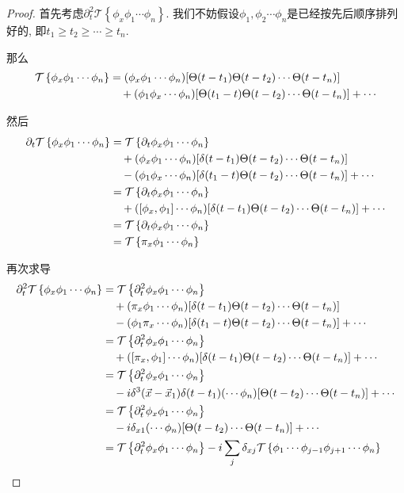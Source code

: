 \begin{proof}
    首先考虑$\partial_t^2\mathcal T\left\{\phi_x\phi_1\cdots\phi_n\right\}$. 我们不妨假设$\phi_1, \phi_2\cdots\phi_n$是已经按先后顺序排列好的, 即$t_1\geq t_2\geq\cdots\geq t_n$.
    
    那么
    \begin{align}
        \mathcal T\left\{\phi_x\phi_1\cdots\phi_n\right\}&=(\phi_x\phi_1\cdots\phi_n)[\Theta(t-t_1)\Theta(t-t_2)\cdots\Theta(t-t_n)]\notag\\
        &\quad+(\phi_1\phi_x\cdots\phi_n)[\Theta(t_1-t)\Theta(t-t_2)\cdots\Theta(t-t_n)]+\cdots
    \end{align}

    然后
    \begin{align}
        \partial_t\mathcal T\left\{\phi_x\phi_1\cdots\phi_n\right\}&=\mathcal T\left\{\partial_t\phi_x\phi_1\cdots\phi_n\right\}\notag\\
        &\quad+(\phi_x\phi_1\cdots\phi_n)[\delta(t-t_1)\Theta(t-t_2)\cdots\Theta(t-t_n)]\notag\\
        &\quad-(\phi_1\phi_x\cdots\phi_n)[\delta(t_1-t)\Theta(t-t_2)\cdots\Theta(t-t_n)]+\cdots\\
        &=\mathcal T\left\{\partial_t\phi_x\phi_1\cdots\phi_n\right\}\notag\\
        &\quad+([\phi_x, \phi_1]\cdots\phi_n)[\delta(t-t_1)\Theta(t-t_2)\cdots\Theta(t-t_n)]+\cdots\\
        &=\mathcal T\left\{\partial_t\phi_x\phi_1\cdots\phi_n\right\}\\
        &=\mathcal T\left\{\pi_x\phi_1\cdots\phi_n\right\}
    \end{align}

    再次求导
    \begin{align}
        \partial_t^2\mathcal T\left\{\phi_x\phi_1\cdots\phi_n\right\}&=\mathcal T\left\{\partial_t^2\phi_x\phi_1\cdots\phi_n\right\}\notag\\
        &\quad+(\pi_x\phi_1\cdots\phi_n)[\delta(t-t_1)\Theta(t-t_2)\cdots\Theta(t-t_n)]\notag\\
        &\quad-(\phi_1\pi_x\cdots\phi_n)[\delta(t_1-t)\Theta(t-t_2)\cdots\Theta(t-t_n)]+\cdots\\
        &=\mathcal T\left\{\partial_t^2\phi_x\phi_1\cdots\phi_n\right\}\notag\\
        &\quad+([\pi_x, \phi_1]\cdots\phi_n)[\delta(t-t_1)\Theta(t-t_2)\cdots\Theta(t-t_n)]+\cdots\\
        &=\mathcal T\left\{\partial_t^2\phi_x\phi_1\cdots\phi_n\right\}\notag\\
        &\quad-i\delta^3(\vec x-\vec x_1)\delta(t-t_1)(\cdots\phi_n)[\Theta(t-t_2)\cdots\Theta(t-t_n)]+\cdots\\
        &=\mathcal T\left\{\partial_t^2\phi_x\phi_1\cdots\phi_n\right\}\notag\\
        &\quad-i\delta_{x1}(\cdots\phi_n)[\Theta(t-t_2)\cdots\Theta(t-t_n)]+\cdots\\
        &=\mathcal T\left\{\partial_t^2\phi_x\phi_1\cdots\phi_n\right\}-i\sum_j \delta_{xj}\mathcal T\left\{\phi_1\cdots\phi_{j-1}\phi_{j+1}\cdots\phi_n\right\}
    \end{align}


\end{proof}
